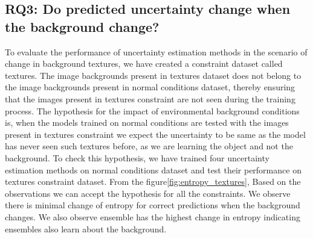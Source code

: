 \subsection{RQ3: Do predicted uncertainty change when the background change?}
To evaluate the performance of uncertainty estimation methods in the scenario of change in background textures, we have created a constraint dataset called textures. The image backgrounds present in textures dataset does not belong to the image backgrounds present in normal conditions dataset, thereby ensuring that the images present in textures constraint are not seen during the training process. The hypothesis for the impact of environmental background conditions is, when the models trained on normal conditions are tested with the images present in textures constraint we expect the uncertainty to be same as the model has never seen such textures before, as we are learning the object and not the background. To check this hypothesis, we have trained four uncertainty estimation methods on normal conditions dataset and test their performance on textures constraint dataset. From the figure\cref{fig:entropy_textures}, 
Based on the observations we can accept the hypothesis for all the constraints. We observe there is minimal change of entropy for correct predictions when the background changes.  We also observe ensemble has the highest change in entropy indicating ensembles also learn about the background.
 
